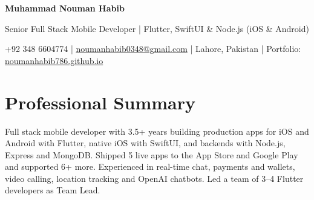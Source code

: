 \documentclass[10pt,letterpaper]{article}
\begin{document}
\raggedright

\begin{center}
  {\fontsize{16}{19}\selectfont\bfseries\color{navy} Muhammad Nouman Habib}\par
  \vspace{4pt}
  {\fontsize{11}{13}\selectfont\color{graytext} Senior Full Stack Mobile Developer | Flutter, SwiftUI \& Node.js (iOS \& Android)}\par
  \vspace{6pt}
  {\color{graytext} +92 348 6604774 \enspace|\enspace
   \href{mailto:noumanhabib0348@gmail.com}{noumanhabib0348@gmail.com} \enspace|\enspace
   Lahore, Pakistan \enspace|\enspace
   Portfolio: \href{https://noumanhabib786.github.io}{noumanhabib786.github.io}}\par
\end{center}
\vspace{-4pt}

\section{Professional Summary}
Full stack mobile developer with 3.5+ years building production apps for iOS and Android with Flutter, native iOS with SwiftUI, and backends with Node.js, Express and MongoDB. Shipped 5 live apps to the App Store and Google Play and supported 6+ more. Experienced in real-time chat, payments and wallets, video calling, location tracking and OpenAI chatbots. Led a team of 3--4 Flutter developers as Team Lead.

\end{document}
